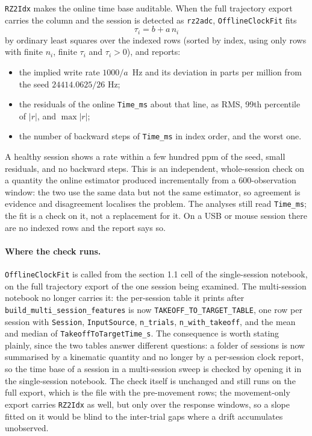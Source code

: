 \documentclass[11pt,a4paper]{article}
\newcommand{\code}[1]{\texttt{\small #1}}
\begin{document}
\code{RZ2Idx} makes the online time base auditable. When the full trajectory
export carries the column and the session is detected as \code{rz2adc},
\code{OfflineClockFit} fits
\begin{equation}
  \tau_i = b + a\,n_i
  \label{eq:offlinefit}
\end{equation}
by ordinary least squares over the indexed rows (sorted by index, using only
rows with finite $n_i$, finite $\tau_i$ and $\tau_i > 0$), and reports:

\begin{itemize}[leftmargin=*,itemsep=2pt]
\item the implied write rate $1000/a$~Hz and its deviation in parts per million
from the seed $24414.0625/26$ Hz;
\item the residuals of the online \code{Time\_ms} about that line, as RMS, 99th
percentile of $|r|$, and $\max|r|$;
\item the number of backward steps of \code{Time\_ms} in index order, and the
worst one.
\end{itemize}

A healthy session shows a rate within a few hundred ppm of the seed, small
residuals, and no backward steps. This is an independent, whole-session check on
a quantity the online estimator produced incrementally from a 600-observation
window: the two use the same data but not the same estimator, so agreement is
evidence and disagreement localises the problem. The analyses still read
\code{Time\_ms}; the fit is a check on it, not a replacement for it. On a USB or
mouse session there are no indexed rows and the report says so.

\paragraph{Where the check runs.} \code{OfflineClockFit} is called from the
section 1.1 cell of the single-session notebook, on the full trajectory export
of the one session being examined. The multi-session notebook no longer carries
it: the per-session table it prints after
\code{build\_multi\_session\_features} is now
\code{TAKEOFF\_TO\_TARGET\_TABLE}, one row per session with \code{Session},
\code{InputSource}, \code{n\_trials}, \code{n\_with\_takeoff}, and the mean and
median of \code{TakeoffToTargetTime\_s}. The consequence is worth stating
plainly, since the two tables answer different questions: a folder of sessions
is now summarised by a kinematic quantity and no longer by a per-session clock
report, so the time base of a session in a multi-session sweep is checked by
opening it in the single-session notebook. The check itself is unchanged and
still runs on the full export, which is the file with the pre-movement rows;
the movement-only export carries \code{RZ2Idx} as well, but only over the
response windows, so a slope fitted on it would be blind to the inter-trial
gaps where a drift accumulates unobserved.
\end{document}
